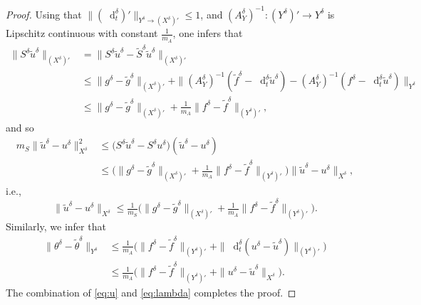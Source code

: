 \documentclass[10pt,a4paper]{amsart}
\newcommand{\be}{\begin{equation}}
\newcommand*\diff{\mathop{}\!\mathrm{d}}
\newcommand{\ee}{\end{equation}}
\begin{document}
\begin{proof}
Using that $\|(\diff^\delta_t)'\|_{Y^\delta \rightarrow (X^\delta)'} \leq 1$, and $(A_Y^\delta)^{-1}\colon (Y^\delta)' \rightarrow Y^\delta$ is Lipschitz continuous with constant $\frac{1}{m_A}$, one  infers that
\begin{align*}
\|S^\delta \widetilde{u}^\delta\|_{(X^\delta)'}&=\|S^\delta \widetilde{u}^\delta-\widetilde{S}^\delta \widetilde{u}^\delta\|_{(X^\delta)'}\\ & \leq
\|g^\delta-\widetilde{g}^\delta\|_{(X^\delta)'}+\|(A_Y^\delta)^{-1}(\widetilde{f}^\delta-\diff_t^\delta \widetilde{u}^\delta)-(A_Y^\delta)^{-1}(f^\delta-\diff_t^\delta \widetilde{u}^\delta)\|_{Y^\delta}
\\ & \leq \|g^\delta-\widetilde{g}^\delta\|_{(X^\delta)'}+\tfrac{1}{m_A} \|f^\delta-\widetilde{f}^\delta\|_{(Y^\delta)'},
\end{align*}
and so
\begin{align*}
m_{S} \|\widetilde{u}^\delta-u^\delta\|_{X^\delta}^2 &\leq \big(S^\delta \widetilde{u}^\delta-S^\delta u^\delta \big)(\widetilde{u}^\delta-u^\delta) \\
&\leq
\big(\|g^\delta-\widetilde{g}^\delta\|_{(X^\delta)'}+\tfrac{1}{m_A}\|f^\delta-\widetilde{f}^\delta\|_{(Y^\delta)'}\big)\|\widetilde{u}^\delta-u^\delta\|_{X^\delta},
\end{align*}
i.e.,
\be \label{eq:u}
\|\widetilde{u}^\delta-u^\delta\|_{X^\delta} \leq \tfrac{1}{m_{S}}\big(\|g^\delta-\widetilde{g}^\delta\|_{(X^\delta)'}+\tfrac{1}{m_A}\|f^\delta-\widetilde{f}^\delta\|_{(Y^\delta)'}\big).
\ee
Similarly, we infer that
\begin{align} \nonumber
\|\theta^\delta-\widetilde{\theta}^\delta\|_{Y^\delta} &\leq \tfrac{1}{m_A} \big(\|f^\delta-\widetilde{f}^\delta\|_{(Y^\delta)'}+\|\diff_t^\delta (u^\delta-\widetilde{u}^\delta)\|_{(Y^\delta)'}\big)\\ \label{eq:lambda}
&\leq \tfrac{1}{m_A} \big(\|f^\delta-\widetilde{f}^\delta\|_{(Y^\delta)'}+\|u^\delta-\widetilde{u}^\delta\|_{X^\delta}).
\end{align}
The combination of \eqref{eq:u} and \eqref{eq:lambda} completes the proof.
\end{proof}
\end{document}
